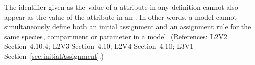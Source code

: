 The identifier given as the value of a 
attribute in any \InitialAssignment definition cannot also appear
as the value of the  attribute in an
\AssignmentRule.  In other words, a model cannot
simultaneously define both an initial assignment and an assignment rule for
the same species, compartment or parameter in a model.
(References: L2V2 Section~4.10.4; L2V3
Section~4.10; L2V4 Section~4.10; L3V1 Section~\ref{sec:initialAssignment}.)
